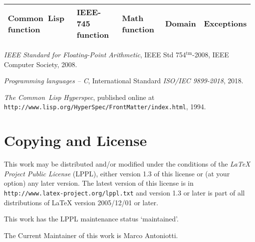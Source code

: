 \documentclass[10pt,fleqn]{article}
\newcommand{\CL}{\textsf{Common~Lisp}}
\begin{document}
\begin{table}[h]
  \begin{tabularx}{\textwidth}{|X|X|X|X|X|}
    \hline
    \CL{} function & IEEE-745 function & Math function & Domain &
    Exceptions\\
    \hline\hline
    
  \end{tabularx}
\end{table}





\begin{thebibliography}{9}

  \textit{{IEEE} Standard for Floating-Point Arithmetic}, IEEE Std
  754$^{\mathrm{tm}}$-2008, IEEE Computer Society, 2008.
  
  \textit{Programming languages -- C},
  International Standard \emph{ISO/IEC 9899-2018}, 2018.
  
  \textit{The \CL{} Hyperspec},
  published online at\\
  \texttt{http://www.lisp.org/HyperSpec/FrontMatter/index.html}, 1994.

\end{thebibliography}


\appendix

\section{Copying and License}

This work may be distributed and/or modified under the conditions of
the \emph{LaTeX Project Public License} (LPPL), either version 1.3 of this license
or (at your option) any later version. The latest version of this
license is in \texttt{http://www.latex-project.org/lppl.txt} and version 1.3 or
later is part of all distributions of LaTeX version 2005/12/01 or
later.

\noindent
This work has the LPPL maintenance status `maintained'.

\noindent
The Current Maintainer of this work is Marco Antoniotti.
\end{document}
